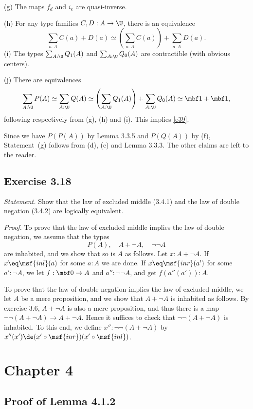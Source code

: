 \documentclass[12pt]{article}
\begin{document}
\nn(g) The maps $f_d$ and $i_e$ are quasi-inverse.

\nn(h) For any type families $C,D:A\to\U$, there is an equivalence 
$$
\sum_{a:A}C(a)+D(a)\simeq\left(\sum_{a:A}C(a)\right)+\sum_{a:A}D(a).
$$
\nn(i) The types $\sum_{A:\U}Q_1(A)$ and $\sum_{A:\U}Q_0(A)$ are contractible (with obvious centers).

\nn(j) There are equivalences 
$$
\sum_{A:\U}P(A)\simeq\sum_{A:\U}Q(A)\simeq\left(\sum_{A:\U}Q_1(A)\right)+\sum_{A:\U}Q_0(A)\simeq\mbf1+\mbf1,
$$ 
following respectively from (g), (h) and (i). This implies \eqref{e39}.

Since we have $P(P(A))$ by Lemma 3.3.5 and $P(Q(A))$ by (f), Statement~(g) follows from (d), (e) and Lemma 3.3.3. The other claims are left to the reader.


\subsection{Exercise 3.18}

\emph{Statement.} Show that the law of excluded middle (3.4.1) and the law of double negation (3.4.2) are logically equivalent.

\nn\emph{Proof.} To prove that the law of excluded middle implies the law of double negation, we assume that the types 
$$
P(A),\quad A+\neg A,\quad \neg\neg A
$$ 
are inhabited, and we show that so is $A$ as follows. Let $x:A+\neg A$. If $x\eq\msf{inl}(a)$ for some $a:A$ we are done. If $x\eq\msf{inr}(a')$ for some $a':\neg A$, we let $f:\mbf0\to A$ and $a'':\neg\neg A$, and get $f(a''(a')):A$. 

To prove that the law of double negation implies the law of excluded middle, we let $A$ be a mere proposition, and we show that $A+\neg A$ is inhabited as follows. By exercise 3.6, $A+\neg A$ is also a mere proposition, and thus there is a map $\neg\neg(A+\neg A)\to A+\neg A$. Hence it suffices to check that $\neg\neg(A+\neg A)$ is inhabited. To this end, we define $x'':\neg\neg(A+\neg A)$ by $x''(x')\de(x'\circ\msf{inr})(x'\circ\msf{inl})$.


\section{Chapter 4}

\subsection{Proof of Lemma 4.1.2}
\end{document}
